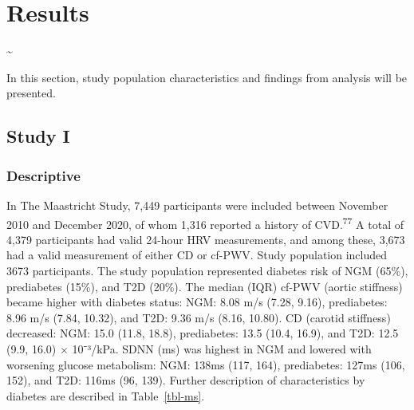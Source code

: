 \documentclass[
  a4paper,
  headsepline=true,
  open=any]{scrbook}
\begin{document}

\hypertarget{results}{%
\chapter{Results}\label{results}}

\newpage

\thispagestyle{empty}

\textasciitilde{} \newpage

In this section, study population characteristics and findings from
analysis will be presented.

\hypertarget{study-i}{%
\section{Study I}\label{study-i}}

\hypertarget{descriptive}{%
\subsection{Descriptive}\label{descriptive}}

In The Maastricht Study, 7,449 participants were included between
November 2010 and December 2020, of whom 1,316 reported a history of
CVD.\textsuperscript{77} A total of 4,379 participants had valid 24-hour
HRV measurements, and among these, 3,673 had a valid measurement of
either CD or cf-PWV. Study population included 3673 participants. The
study population represented diabetes risk of NGM (65\%), prediabetes
(15\%), and T2D (20\%). The median (IQR) cf-PWV (aortic stiffness)
became higher with diabetes status: NGM: 8.08 m/s (7.28, 9.16),
prediabetes: 8.96 m/s (7.84, 10.32), and T2D: 9.36 m/s (8.16, 10.80). CD
(carotid stiffness) decreased: NGM: 15.0 (11.8, 18.8), prediabetes: 13.5
(10.4, 16.9), and T2D: 12.5 (9.9, 16.0) × 10⁻³/kPa. SDNN (ms) was
highest in NGM and lowered with worsening glucose metabolism: NGM: 138ms
(117, 164), prediabetes: 127ms (106, 152), and T2D: 116ms (96, 139).
Further description of characteristics by diabetes are described in
Table~\ref{tbl-ms}.

\end{document}
